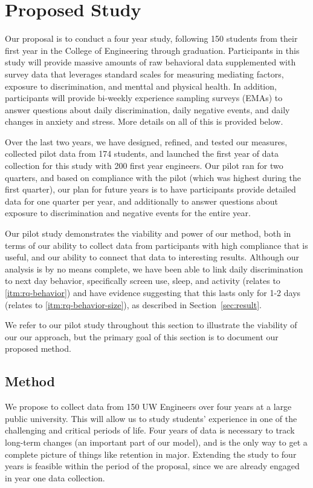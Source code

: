 \section{Proposed Study}
\label{sec:study}
\noindent Our proposal is to conduct a four year study, following 150 students from their first year in the College of Engineering through graduation. Participants in this study will provide massive amounts of raw behavioral data supplemented with survey data that leverages standard scales for measuring mediating factors, exposure to discrimination, and menttal and physical health. In addition, participants will provide bi-weekly experience sampling surveys  (EMAs) to answer questions about daily discrimination, daily negative events, and daily changes in anxiety and stress. More details on all of this is provided below.

Over the last two years, we have designed, refined, and tested our measures, collected pilot data from 174 students, and launched the first year of data collection for this study with 200 first year engineers. Our pilot ran for two quarters, and based on compliance with the pilot (which was highest during the first quarter), our plan for future years is to have participants provide detailed data for one quarter per year, and additionally to answer questions about exposure to discrimination and negative events for the entire year.  

Our pilot study demonstrates the viability and power of our method, both in terms of our ability to collect data from participants with high compliance that is useful, and our ability to connect that data to interesting results. Although our analysis is by no means complete, we have been able to link daily discrimination to next day behavior, specifically screen use, sleep, and activity (relates to \ref{itm:rq-behavior}) and have evidence suggesting that this lasts only for 1-2 days (relates to \ref{itm:rq-behavior-size}), as described in Section~\ref{sec:result}. 

We refer to our pilot study throughout this section to illustrate the viability of our our approach, but the primary goal of this section is to document our proposed method. 

\subsection{Method}
\noindent
We propose to collect data from 150 UW Engineers over four years at a large public university. This will allow us to study students' experience in one of the challenging and critical periods of life. Four years of data is necessary to track long-term changes (an important part of our model), and is the only way to get a complete picture of things like retention in major.
Extending the study to four years is feasible within the period of the proposal, since we are already engaged in year one data collection.

